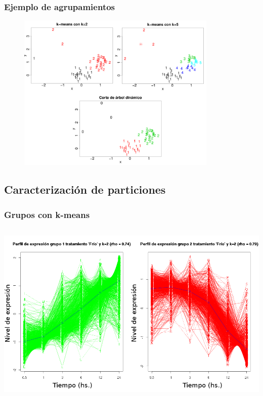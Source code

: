 \documentclass[serif,9pt, t]{beamer}
\begin{document}
\begin{frame}\frametitle{Ejemplo de agrupamientos} 
\begin{figure}
\centering
\includegraphics[width=0.85\textwidth]{ejemplo_agrupaciones.png}
\end{figure}
\end{frame}

\subsection{Caracterización de particiones}
\begin{frame}\frametitle{Grupos con k-means} 
\begin{columns}
\column{\dimexpr\paperwidth-20pt}
\centering
\includegraphics[width=1\textwidth]{perfiles_k_means}	
\end{columns}
\end{frame}
\end{document}
